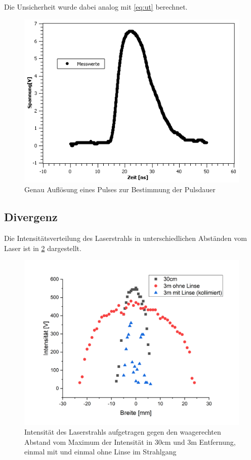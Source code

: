 \documentclass[
	a4paper,
	12pt,
	pagesize,
	ngerman
]{scrartcl}
\begin{document}
Die Unsicherheit wurde dabei analog mit \cref{eq:ut} berechnet.

\begin{figure}[h!]
	\centering
	\includegraphics[scale=0.7]{Pulsdauer.png}
	\caption{Genau Auflösung eines Pulses zur Bestimmung der Pulsdauer}
	\label{Pulsdauer}
\end{figure}

\subsection{Divergenz}
Die Intensitätsverteilung des Laserstrahls in unterschiedlichen Abständen vom Laser ist in \cref{breite} dargestellt.

\begin{figure}[h!]
	\centering
	\includegraphics[scale=0.5]{breite.png}
	\caption{Intensität des Laserstrahls aufgetragen gegen den waagerechten Abstand vom Maximum der Intensität in 30cm und 3m Entfernung, einmal mit und einmal ohne Linse im Strahlgang}
	\label{breite}
\end{figure}
\end{document}
